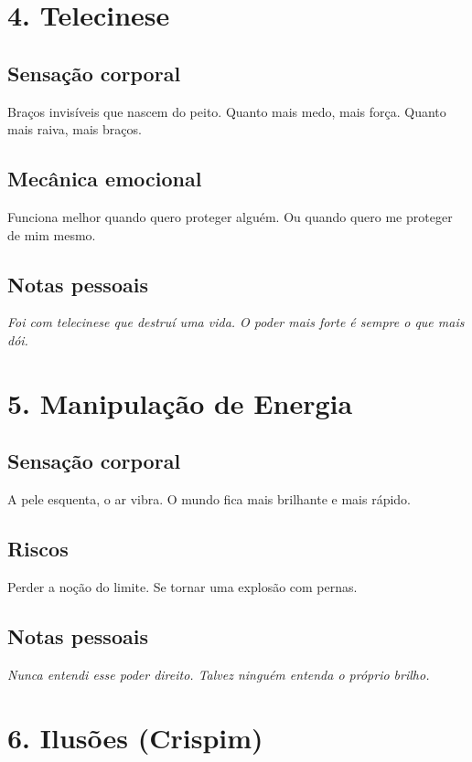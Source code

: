 \section*{4. Telecinese}

\subsection*{Sensação corporal}
Braços invisíveis que nascem do peito.  
Quanto mais medo, mais força.  
Quanto mais raiva, mais braços.

\subsection*{Mecânica emocional}
Funciona melhor quando quero proteger alguém.  
Ou quando quero me proteger de mim mesmo.

\subsection*{Notas pessoais}
\textit{Foi com telecinese que destruí uma vida.  
O poder mais forte é sempre o que mais dói.}

\section*{5. Manipulação de Energia}

\subsection*{Sensação corporal}
A pele esquenta, o ar vibra.  
O mundo fica mais brilhante e mais rápido.

\subsection*{Riscos}
Perder a noção do limite.  
Se tornar uma explosão com pernas.

\subsection*{Notas pessoais}
\textit{Nunca entendi esse poder direito.  
Talvez ninguém entenda o próprio brilho.}

\section*{6. Ilusões (Crispim)}

